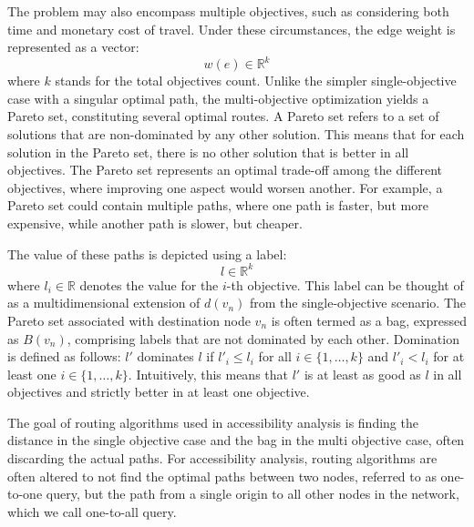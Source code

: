 The problem may also encompass multiple objectives, such as considering both time and monetary cost of travel.
Under these circumstances, the edge weight is represented as a vector:
\[ w(e) \in \mathbb{R}^k \]
where \( k \) stands for the total objectives count.
Unlike the simpler single-objective case with a singular optimal path, the multi-objective optimization yields a Pareto set, constituting several optimal routes.
A Pareto set refers to a set of solutions that are non-dominated by any other solution.
This means that for each solution in the Pareto set, there is no other solution that is better in all objectives.
The Pareto set represents an optimal trade-off among the different objectives, where improving one aspect would worsen another.
For example, a Pareto set could contain multiple paths, where one path is faster, but more expensive, while another path is slower, but cheaper.

The value of these paths is depicted using a label:
\[ l \in \mathbb{R}^k \]
where \( l_i \in \mathbb{R} \) denotes the value for the \( i \)-th objective.
This label can be thought of as a multidimensional extension of \( d(v_n) \) from the single-objective scenario.
The Pareto set associated with destination node \( v_n \) is often termed as a bag, expressed as \( B(v_n) \), comprising labels that are not dominated by each other.
Domination is defined as follows: \( l' \) dominates \( l \) if \( l'_i \leq l_i \) for all \( i \in \{1, \dots, k\} \) and \( l'_i < l_i \) for at least one \( i \in \{1, \dots, k\} \).
Intuitively, this means that \( l' \) is at least as good as \( l \) in all objectives and strictly better in at least one objective.

The goal of routing algorithms used in accessibility analysis is finding the distance in the single objective case and the bag in the multi objective case, often discarding the actual paths.
For accessibility analysis, routing algorithms are often altered to not find the optimal paths between two nodes, referred to as one-to-one query, but the path from a single origin to all other nodes in the network, which we call one-to-all query.

